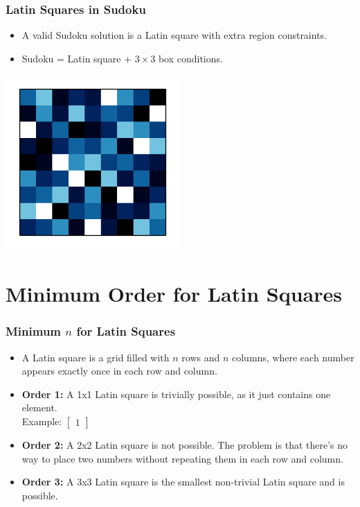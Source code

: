 \documentclass{beamer}
\begin{document}
\begin{frame}
\frametitle{Latin Squares in Sudoku}
\begin{itemize}
  \item A valid Sudoku solution is a Latin square with extra region constraints.
  \item Sudoku = Latin square + $3\times3$ box conditions.
\end{itemize}
\begin{center}
\includegraphics[width=0.5\textwidth]{img1}
\end{center}
\end{frame}

\section{Minimum Order for Latin Squares}
\begin{frame}
\frametitle{Minimum \( n \) for Latin Squares}
\begin{itemize}
  \item A Latin square is a grid filled with \( n \) rows and \( n \) columns, where each number appears exactly once in each row and column.
  \item \textbf{Order 1:} A 1x1 Latin square is trivially possible, as it just contains one element.\\
    Example: \(\begin{bmatrix} 1 \end{bmatrix}\)
  \item \textbf{Order 2:} A 2x2 Latin square is not possible. The problem is that there’s no way to place two numbers without repeating them in each row and column.
  \item \textbf{Order 3:} A 3x3 Latin square is the smallest non-trivial Latin square and is possible.
\end{itemize}
\end{frame}
\end{document}
